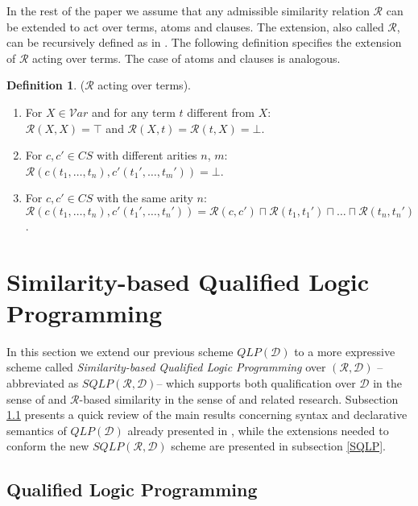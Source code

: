 \documentclass{sigplanconf}
\newcommand{\qdom}{\mathcal{D}} \newcommand{\dqdom}{D \setminus \{\bot\}} \newcommand{\bqdom}{(D \setminus \{\bot\}) \uplus \{?\}}
\newcommand{\simrel}{\mathcal{R}}
\newcommand{\qlp}[1]{QLP({#1})} \newcommand{\slp}[2]{SLP({#1,#2})} \newcommand{\sqlp}[2]{SQLP({#1,#2})} \newcommand{\bqlp}[1]{BQLP({#1})} \newcommand{\clp}[1]{CLP({#1})}
\newcommand{\Prog}{\mathcal{P}} \newcommand{\UProg}{\mathcal{P_U}}
\newcommand{\Var}{\mathcal V\!ar} \newcommand{\War}{\mathcal W\!ar} \newcommand{\elemset}[2]{\mathrm{#1}(#2)} \newcommand{\varset}[1]{\elemset{var}{#1}} \newcommand{\warset}[1]{\elemset{war}{#1}} \newcommand{\domset}[1]{\elemset{dom}{#1}} \newcommand{\Tp}{\mathrm{T}_{\Prog}} \newcommand{\Tpd}{\mathrm{T}_{\Prog,\qdom}} \newcommand{\Mp}{\mathcal{M}_{\Prog}} \newcommand{\M}[1]{\mathcal{M}_{#1}} \newcommand{\Atz}{\mathrm{At}_{\Sigma}} \newcommand{\QAtz}{\mathrm{At}_{\Sigma}(\qdom)} \newcommand{\intd}{\mathrm{Int}_{\Sigma}(\qdom)} \newcommand{\intrd}{\mathrm{Int}_{\Sigma}(\simrel,\qdom)} \newcommand{\sust}{\mathrm{Subst}_{\Sigma}} \newcommand{\sustd}{\sust(\qdom)} \newcommand{\I}{\mathcal{I}} \newcommand{\J}{\mathcal{J}} \newcommand{\at}[2]{#1\,\sharp\,#2} \newcommand{\ats}[1]{\overline{#1}} \newcommand{\qgets}[1]{\gets\!#1\!-} \newcommand{\sep}{~{\talloblong}~} \newcommand{\true}{\texttt{tt}} \newcommand{\false}{\texttt{ff}} \newcommand{\linear}[1]{#1_\ell}
\theoremstyle{definition}
\newtheorem{definition}{Definition}
\theoremstyle{plain}
\begin{document}
In the rest of the paper we assume that any admissible similarity relation $\simrel$ can be extended to act over terms, atoms and clauses. The extension, also called $\simrel$, can be recursively defined as in \cite{Ses02}. The following definition specifies the extension of $\simrel$ acting over terms. The case of atoms and clauses is analogous.

\begin{definition} ($\simrel$ acting over terms). \label{def:ER}
\begin{enumerate}
    \item For $X \in \Var$ and for any term $t$ different from $X$:\\
    $\simrel(X,X) = \top$ and $\simrel(X,t) = \simrel(t,X) = \bot$.

    \item For $c, c' \in CS$ with different arities $n$, $m$:\\
    $\simrel(c(t_1, \ldots, t_n), c'(t_1', \ldots, t_m')) = \bot$.

    \item For $c, c' \in CS$ with the same arity $n$:\\
    $\simrel(c(t_1, \ldots, t_n), c'(t_1', \ldots, t_n')) = \simrel(c,c') \sqcap \simrel(t_1,t_1') \sqcap \ldots \sqcap \simrel(t_n,t_n')$.
\end{enumerate}
\end{definition}

\section{Similarity-based Qualified Logic Programming}\label{Language}

In this section  we extend our previous scheme $\qlp{\qdom}$   to a more expressive scheme called \emph{Similarity-based Qualified Logic Programming} over $(\simrel,\qdom)$ --abbreviated as $\sqlp{\simrel}{\qdom}$-- which supports both qualification over $\qdom$ in the sense of \cite{RR08} and $\simrel$-based similarity in the sense of \cite{Ses02} and related research. Subsection \ref{QLP} presents a quick review of the main results concerning syntax and declarative semantics of $\qlp{\qdom}$ already presented in \cite{RR08}, while the extensions needed to conform the new $\sqlp{\simrel}{\qdom}$ scheme are presented in subsection \ref{SQLP}.


\subsection{Qualified Logic Programming} \label{QLP}
\end{document}
